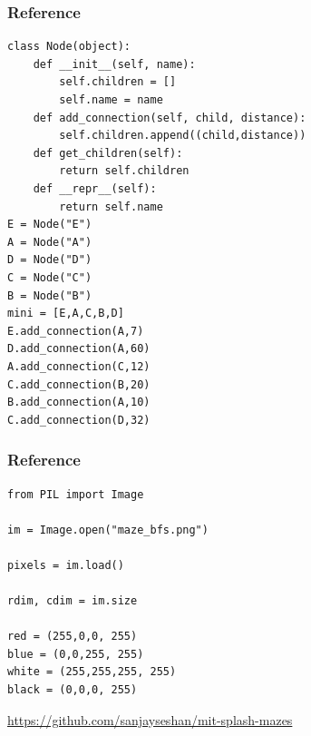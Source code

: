 \documentclass{beamer}
\begin{document}
\begin{frame}[fragile]
    \frametitle{Reference}

\begin{lstlisting}
class Node(object):
    def __init__(self, name):
        self.children = []
        self.name = name
    def add_connection(self, child, distance):
        self.children.append((child,distance))
    def get_children(self):
        return self.children
    def __repr__(self):
        return self.name
E = Node("E")
A = Node("A")
D = Node("D")
C = Node("C")
B = Node("B")
mini = [E,A,C,B,D]
E.add_connection(A,7)
D.add_connection(A,60)
A.add_connection(C,12)
C.add_connection(B,20)
B.add_connection(A,10)
C.add_connection(D,32)
    \end{lstlisting}
\end{frame}
    \begin{frame}[fragile]
        \frametitle{Reference}
    
    \begin{lstlisting}
from PIL import Image

im = Image.open("maze_bfs.png")

pixels = im.load()

rdim, cdim = im.size

red = (255,0,0, 255)
blue = (0,0,255, 255)
white = (255,255,255, 255)
black = (0,0,0, 255)
    \end{lstlisting}
    
    \url{https://github.com/sanjayseshan/mit-splash-mazes}
\end{frame}
\end{document}
